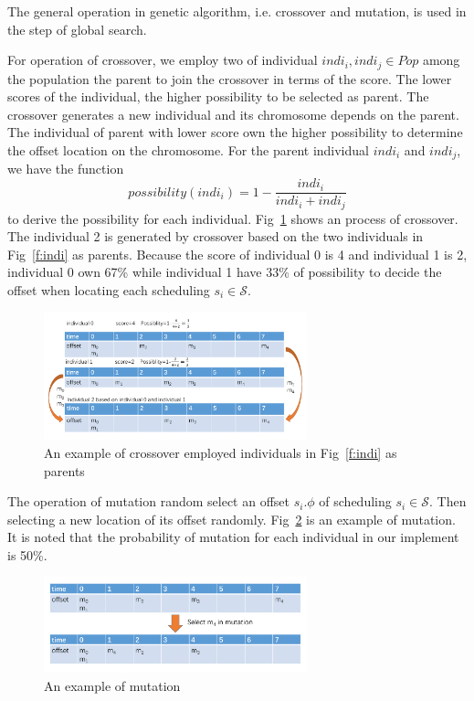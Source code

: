 \documentclass[journal]{IEEEtran}
\newcommand{\calS}{\mathcal{S}}
\begin{document}
The general operation in genetic algorithm,
 i.e. crossover and mutation,
  is used in the step of global search. 

For operation of crossover,
 we employ two of individual $indi_i,indi_j\in Pop$ among the population the parent to join the crossover in terms of the score.
The lower scores of the individual,
 the higher possibility to be selected as parent.
The crossover generates a new individual and its chromosome depends on the parent.
The individual of parent with lower score own the higher possibility to determine the offset location on the chromosome.
For the parent individual $indi_i$ and $indi_j$, we have the function
\begin{equation}
	possibility(indi_i)=1-\frac{indi_i}{indi_i+indi_j}
\end{equation}
to derive the possibility for each individual.
Fig~\ref{f:crossover} shows an process of crossover.
The individual 2 is generated by crossover based on the two individuals in Fig~\ref{f:indi} as parents.
Because the score of individual 0 is 4 and individual 1 is 2, individual 0 own 67\% while individual 1 have 33\% of possibility to decide the offset when locating each scheduling $s_i\in\calS$.
\begin{figure}[!t]
	\centering
	\includegraphics[width=3in]{picture/crossover.pdf}
	\caption{An example of crossover employed individuals in Fig~\ref{f:indi} as parents}
	\label{f:crossover}
\end{figure}

The operation of mutation random select an offset $s_i.\phi$ of scheduling $s_i\in\calS$.
Then selecting a new location of its offset randomly.
Fig~\ref{f:mutation} is an example of mutation.
It is noted that the probability of mutation for each individual in our implement is 50\%.
\begin{figure}[!t]
	\centering
	\includegraphics[width=3in]{picture/mutation.pdf}
	\caption{An example of mutation}
	\label{f:mutation}
\end{figure}
\end{document}
